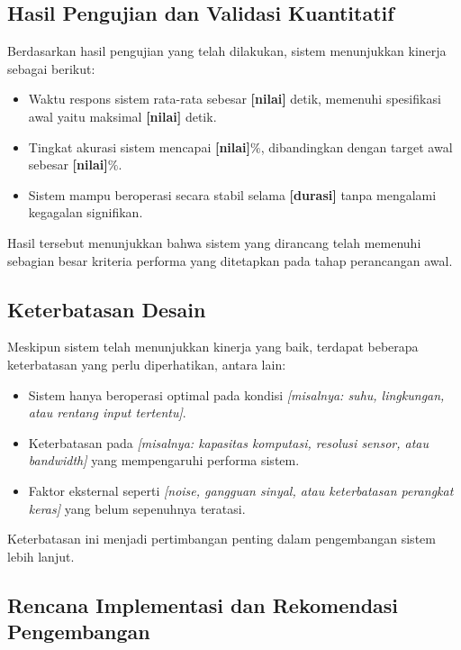 \subsection{Hasil Pengujian dan Validasi Kuantitatif}
\label{subsec:hasil_pengujian}

Berdasarkan hasil pengujian yang telah dilakukan, sistem menunjukkan kinerja sebagai berikut:

\begin{itemize}
    \item Waktu respons sistem rata-rata sebesar \textbf{[nilai]} detik, memenuhi spesifikasi awal yaitu maksimal \textbf{[nilai]} detik.
    \item Tingkat akurasi sistem mencapai \textbf{[nilai]}$\%$, dibandingkan dengan target awal sebesar \textbf{[nilai]}$\%$.
    \item Sistem mampu beroperasi secara stabil selama \textbf{[durasi]} tanpa mengalami kegagalan signifikan.
\end{itemize}

Hasil tersebut menunjukkan bahwa sistem yang dirancang telah memenuhi sebagian besar kriteria performa yang ditetapkan pada tahap perancangan awal.

\subsection{Keterbatasan Desain}
\label{subsec:keterbatasan}

Meskipun sistem telah menunjukkan kinerja yang baik, terdapat beberapa keterbatasan yang perlu diperhatikan, antara lain:

\begin{itemize}
    \item Sistem hanya beroperasi optimal pada kondisi \textit{[misalnya: suhu, lingkungan, atau rentang input tertentu]}.
    \item Keterbatasan pada \textit{[misalnya: kapasitas komputasi, resolusi sensor, atau bandwidth]} yang mempengaruhi performa sistem.
    \item Faktor eksternal seperti \textit{[noise, gangguan sinyal, atau keterbatasan perangkat keras]} yang belum sepenuhnya teratasi.
\end{itemize}

Keterbatasan ini menjadi pertimbangan penting dalam pengembangan sistem lebih lanjut.

\subsection{Rencana Implementasi dan Rekomendasi Pengembangan}
\label{subsec:future_work}

